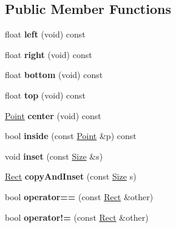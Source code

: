 \subsection*{Public Member Functions}
\begin{DoxyCompactItemize}
\item 
float {\bfseries left} (void) const \hypertarget{classRect_a2da53701fcbf4d358656be1947bee38f}{}\label{classRect_a2da53701fcbf4d358656be1947bee38f}

\item 
float {\bfseries right} (void) const \hypertarget{classRect_a88836ffb0fcf17b48999eb80a0e3a1bc}{}\label{classRect_a88836ffb0fcf17b48999eb80a0e3a1bc}

\item 
float {\bfseries bottom} (void) const \hypertarget{classRect_a2a65bf85ed3260605a4bfeedcb3d21bb}{}\label{classRect_a2a65bf85ed3260605a4bfeedcb3d21bb}

\item 
float {\bfseries top} (void) const \hypertarget{classRect_aad037f331314b464db2156230bed1e50}{}\label{classRect_aad037f331314b464db2156230bed1e50}

\item 
\hyperlink{classPoint}{Point} {\bfseries center} (void) const \hypertarget{classRect_a4f03232343ff3242c2dc0067fbd449be}{}\label{classRect_a4f03232343ff3242c2dc0067fbd449be}

\item 
bool {\bfseries inside} (const \hyperlink{classPoint}{Point} \&p) const \hypertarget{classRect_ab9c0434b8f8e99d9af351d1a3aeb4817}{}\label{classRect_ab9c0434b8f8e99d9af351d1a3aeb4817}

\item 
void {\bfseries inset} (const \hyperlink{structSize}{Size} \&s)\hypertarget{classRect_a6ebbffd1ac1b426cb9a576c770c982f0}{}\label{classRect_a6ebbffd1ac1b426cb9a576c770c982f0}

\item 
\hyperlink{classRect}{Rect} {\bfseries copy\+And\+Inset} (const \hyperlink{structSize}{Size} s)\hypertarget{classRect_aad6d1c662406af7f0777976b0e85f15b}{}\label{classRect_aad6d1c662406af7f0777976b0e85f15b}

\item 
bool {\bfseries operator==} (const \hyperlink{classRect}{Rect} \&other)\hypertarget{classRect_a71e55560cf9c86d5bad51faa51605aba}{}\label{classRect_a71e55560cf9c86d5bad51faa51605aba}

\item 
bool {\bfseries operator!=} (const \hyperlink{classRect}{Rect} \&other)\hypertarget{classRect_af2a1ad55d1c9fb6af8b7d2b14ba7d41a}{}\label{classRect_af2a1ad55d1c9fb6af8b7d2b14ba7d41a}


\end{DoxyCompactItemize}
